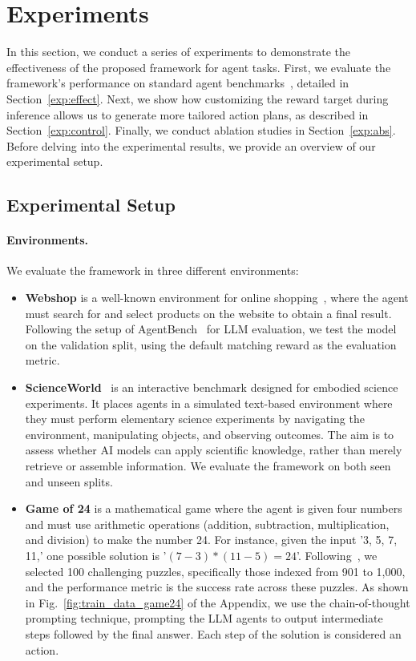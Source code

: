 \section{Experiments}
In this section, we conduct a series of experiments to demonstrate the effectiveness of the proposed framework for agent tasks. First, we evaluate the framework's performance on standard agent benchmarks~\citep{yao2023webshopscalablerealworldweb,scienceworld2022,yao2023treethoughtsdeliberateproblem}, detailed in Section~\ref{exp:effect}. Next, we show how customizing the reward target during inference allows us to generate more tailored action plans, as described in Section~\ref{exp:control}. Finally, we conduct ablation studies in Section~\ref{exp:abs}. Before delving into the experimental results, we provide an overview of our experimental setup.

\subsection{Experimental Setup}
\paragraph{Environments.} We evaluate the \Model framework in three different environments: 

\vspace{-2mm}
\begin{itemize}

\item \textbf{Webshop} is a well-known environment for online shopping~\citep{yao2023webshopscalablerealworldweb}, where the agent must search for and select products on the website to obtain a final result. Following the setup of AgentBench~\citep{liu2023agentbench} for LLM evaluation, we test the model on the validation split, using the default matching reward as the evaluation metric.
    \item \textbf{ScienceWorld}~\citep{scienceworld2022} is an interactive benchmark designed for embodied science experiments. It places agents in a simulated text-based environment where they must perform elementary science experiments by navigating the environment, manipulating objects, and observing outcomes. The aim is to assess whether AI models can apply scientific knowledge, rather than merely retrieve or assemble information. We evaluate the framework on both seen and unseen splits.
    \item \textbf{Game of 24} is a mathematical game where the agent is given four numbers and must use arithmetic operations (addition, subtraction, multiplication, and division) to make the number 24. For instance, given the input '3, 5, 7, 11,' one possible solution is '$(7 - 3) * (11 - 5) = 24$'. Following~\cite{yao2023treethoughtsdeliberateproblem}, we selected 100 challenging puzzles, specifically those indexed from 901 to 1,000, and the performance metric is the success rate across these puzzles. As shown in Fig.~\ref{fig:train_data_game24} of the Appendix, we use the chain-of-thought prompting technique, prompting the LLM agents to output intermediate steps followed by the final answer. Each step of the solution is considered an action.
\end{itemize}

